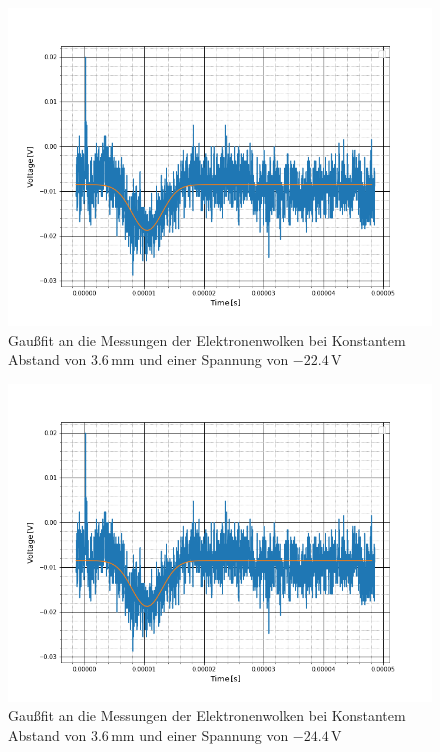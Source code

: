 \begin{figure}
	\includegraphics[scale=0.5]{Bild/A1}
	\centering
	\caption[Gaußfit an Messung bei Konst. Abstand]{Gaußfit an die Messungen der Elektronenwolken bei Konstantem Abstand von $3.6$\,mm und einer Spannung von $-22.4$\,V}
\end{figure}
\begin{figure}
	\includegraphics[scale=0.5]{Bild/A1}
	\centering
	\caption[Gaußfit an Messung bei Konst. Abstand]{Gaußfit an die Messungen der Elektronenwolken bei Konstantem Abstand von $3.6$\,mm und einer Spannung von $-24.4$\,V}
\end{figure}
